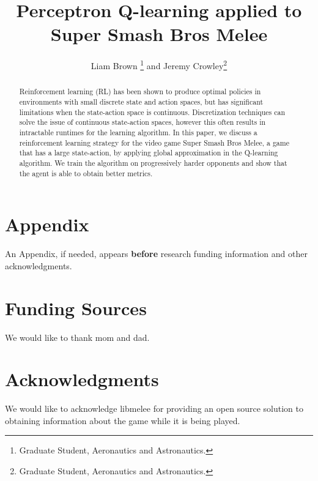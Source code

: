 \documentclass[journal]{new-aiaa}
\title{Perceptron Q-learning applied to Super Smash Bros Melee}
\author{Liam Brown \footnote{Graduate Student, Aeronautics and Astronautics.} and Jeremy Crowley\footnote{Graduate Student, Aeronautics and Astronautics.}}
\affil{Stanford University, Stanford, CA, 94305}
\begin{document}
\maketitle

\begin{abstract}
Reinforcement learning (RL) has been shown to produce optimal policies in environments with small discrete state and action spaces, but has significant limitations when the state-action space is continuous. Discretization techniques can solve the issue of continuous state-action spaces, however this often results in intractable runtimes for the learning algorithm. In this paper, we discuss a reinforcement learning strategy for the video game Super Smash Bros Melee, a game that has a large state-action, by applying global approximation in the Q-learning algorithm. We train the algorithm on progressively harder opponents and show that the agent is able to obtain better metrics.
\end{abstract}


%
%



%
%



%
%



%
%



%
%



%
%



%
%
\section*{Appendix}

An Appendix, if needed, appears \textbf{before} research funding information and other acknowledgments.


%
%
\section*{Funding Sources}

We would like to thank mom and dad.


%
%
\section*{Acknowledgments}

We would like to acknowledge libmelee for providing an open source solution to obtaining information about the game while it is being played.



\end{document}
